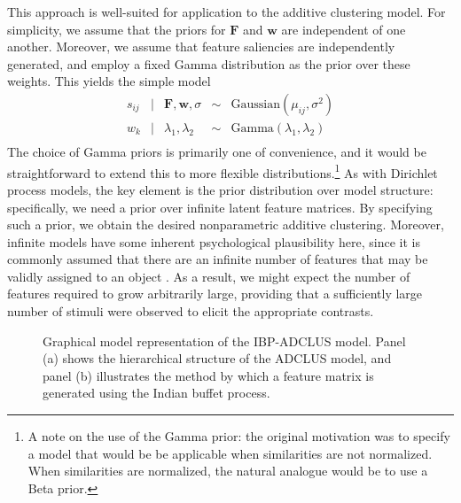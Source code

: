 \documentclass[11pt]{article}
\newcommand{\condon}{|}
\newcommand{\capspace}{}
\begin{document}
This approach is well-suited for application to the additive clustering model. For simplicity, we assume that the priors for $\mathbf{F}$ and $\mathbf{w}$ are independent of one another. Moreover, we assume that feature saliencies are independently generated, and employ a fixed Gamma distribution as the prior over these weights. This yields the simple model
    \begin{equation}
    \begin{array}{rclcl}
    s_{ij} & \condon & \mathbf{F},\mathbf{w},\sigma &\sim &\mbox{Gaussian}(\mu_{ij},\sigma^2) \\
    w_k & \condon & \lambda_1, \lambda_2 & \sim & \mbox{Gamma}(\lambda_1, \lambda_2) \\
    \end{array}
    \label{fullmodel1}
    \end{equation}
The choice of Gamma priors is primarily one of convenience, and it would be straightforward to extend this to more flexible distributions.\footnote{A note on the use of the Gamma prior: the original motivation was to specify a model that would be be applicable when similarities are not normalized. When similarities are normalized, the natural analogue would be to use a Beta prior.} As with Dirichlet process models, the key element is the prior distribution over model structure: specifically, we need a prior over infinite latent feature matrices. By specifying such a prior, we obtain the desired nonparametric additive clustering. Moreover, infinite models have some inherent psychological plausibility here, since it is commonly assumed that there are an infinite number of features that may be validly assigned to an object \cite{goodman72}. As a result, we might expect the number of features required to grow arbitrarily large, providing that a sufficiently large number of stimuli were observed to elicit the appropriate contrasts.


\begin{figure*}
\begin{center}
\caption{\capspace Graphical model representation of the IBP-ADCLUS model. Panel (a) shows the hierarchical
structure of the ADCLUS model, and panel (b) illustrates the method by which a feature matrix is generated
using the Indian buffet process.}
\label{graphicalmodel}
\end{center}
\end{figure*}
\end{document}
